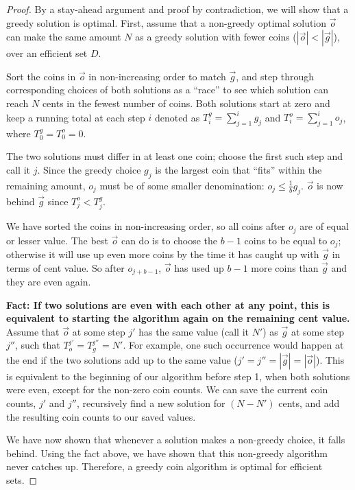 \documentclass[12pt]{article}
\begin{document}
\begin{proof}
By a stay-ahead argument and proof by contradiction, we will show that
a greedy solution is optimal.
First, assume that a non-greedy optimal solution $\vec{o}$ can make the
same amount $N$ as a greedy solution with fewer coins ($|\vec{o}| < | \vec{g}|$),
over an efficient set $D$.

Sort the coins in $\vec{o}$ in non-increasing order to match $\vec{g}$, and
step through corresponding choices of both solutions as a ``race'' to see which
solution can reach $N$ cents in the fewest number of coins.
Both solutions start at zero and keep a running total at each
step $i$ denoted as $T^g_i = \sum_{j=1}^i{g_j}$ and
$T^o_i = \sum_{j=1}^i{o_j}$, where $T^g_0=T^o_0 = 0$.

The two solutions must differ in at least one coin; choose the
first such step and call it $j$.
Since
the greedy choice $g_j$ is the largest coin that ``fits'' within the remaining
amount, $o_j$ must be of some smaller denomination: $o_j \le \frac{1}{b}g_j$.
$\vec{o}$ is now behind $\vec{g}$ since $T^o_j < T^g_j$.


We have sorted the coins in non-increasing order, so all coins after
$o_j$ are of equal or lesser value.
The best $\vec{o}$ can do is to choose the $b-1$ coins to be equal to
$o_j$; otherwise it will use up even more coins by the time it has
caught up with $\vec{g}$ in terms of cent value.
So after 
$o_{j+b-1}$, $\vec{o}$ has used up $b-1$ more coins than $\vec{g}$ 
and they are even again.

\textbf{Fact: If two solutions are even with each other at any point,
this is equivalent to starting the algorithm again on the remaining cent
value.} Assume that $\vec{o}$ at some step $j'$ has the same value
(call it $N'$) as
$\vec{g}$ at some step $j''$, such that $T_o^{j'} =T_g^{j''}=N'$.
For example, one such occurrence would happen at the end
if the two solutions add up to the same value
($j'=j''=|\vec{g}|=|\vec{o}|$). This is equivalent to the beginning of
our algorithm before step 1, when both solutions were even,
except for the non-zero coin counts.
We can save the current coin counts,
$j'$ and $j''$, recursively find a new solution for $(N-N')$ cents, and
add the resulting coin counts to our saved values.

We have now shown that whenever a solution makes a non-greedy choice,
it falls behind. Using the fact above, we have shown that this
non-greedy algorithm never catches up. Therefore, a greedy coin algorithm
is optimal for efficient sets.

\end{proof}
\end{document}
